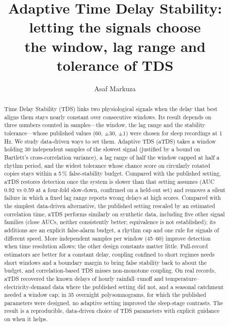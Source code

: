 \documentclass[11pt,a4paper]{article}
\title{Adaptive Time Delay Stability: letting the signals choose\\the window, lag range and tolerance of TDS}
\author{Asaf Markuza}
\date{}
\begin{document}
\maketitle

\begin{abstract}
Time Delay Stability (TDS) links two physiological signals when the delay that best aligns them stays nearly constant over consecutive windows. Its result depends on three numbers counted in samples---the window, the lag range and the stability tolerance---whose published values (60, $\pm30$, $\pm1$) were chosen for sleep recordings at 1\,Hz. We study data-driven ways to set them. Adaptive TDS (aTDS) takes a window holding 30 independent samples of the slowest signal (justified by a bound on Bartlett's cross-correlation variance), a lag range of half the window capped at half a rhythm period, and the widest tolerance whose chance score on circularly rotated copies stays within a 5\,\% false-stability budget. Compared with the published setting, aTDS restores detection once the system is slower than that setting assumes (AUC 0.92 vs 0.59 at a four-fold slow-down, confirmed on a held-out set) and removes a silent failure in which a fixed lag range reports wrong delays at high scores. Compared with the simplest data-driven alternative, the published setting rescaled by an estimated correlation time, aTDS performs similarly on synthetic data, including five other signal families (close AUCs, neither consistently better; equivalence is not established); its additions are an explicit false-alarm budget, a rhythm cap and one rule for signals of different speed. More independent samples per window (45--60) improve detection when time resolution allows; the other design constants matter little. Full-record estimators are better for a constant delay, coupling confined to short regimes needs short windows and a boundary margin to bring false stability back to about the budget, and correlation-based TDS misses non-monotone coupling. On real records, aTDS recovered the known delays of hourly rainfall--runoff and temperature--electricity-demand data where the published setting did not, and a seasonal catchment needed a window cap; in 35 overnight polysomnograms, for which the published parameters were designed, no adaptive setting improved the sleep-stage contrasts. The result is a reproducible, data-driven choice of TDS parameters with explicit guidance on when it helps.
\end{abstract}
\end{document}
